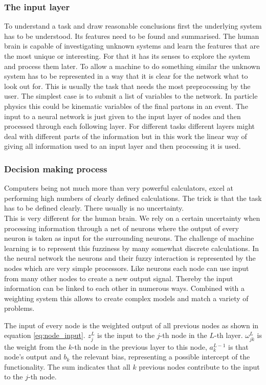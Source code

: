 \subsubsection{The input layer}

To understand a task and draw reasonable conclusions first the underlying system has to be understood. Its features need to be found and summarised. The human brain is capable of investigating unknown systems and learn the features that are the most unique or interesting. For that it has its senses to explore the system and process them later. To allow a machine to do something similar the unknown system has to be represented in a way that it is clear for the network what to look out for. This is usually the task that needs the most preprocessing by the user. The simplest case is to submit a list of variables to the network. In particle physics this could be kinematic variables of the final partons in an event.
The input to a neural network is just given to the input layer of nodes and then processed through each following layer. For different tasks different layers might deal with different parts of the information but in this work the linear way of giving all information used to an input layer and then processing it is used.

\subsubsection{Decision making process}

Computers being not much more than very powerful calculators, excel at performing high numbers of clearly defined calculations. The trick is that the task has to be defined clearly. There usually is no uncertainty.\\
This is very different for the human brain. We rely on a certain uncertainty when processing information through a net of neurons where the output of every neuron is taken as input for the surrounding neurons. The challenge of machine learning is to represent this fuzziness by many somewhat discrete calculations. In the neural network the neurons and their fuzzy interaction is represented by the nodes which are very simple processors. Like neurons each node can use input from many other nodes to create a new output signal. Thereby the input information can be linked to each other in numerous ways. Combined with a weighting system this allows to create complex models and match a variety of problems.

The input of every node is the weighted output of all previous nodes as shown in equation \eqref{eq:node_input}. $z_j^L$ is the input to the $j$-th node in the $L$-th layer. $\omega_{jk}^L$ is the weight from the $k$-th node in the previous layer to this node, $a_k^{L-1}$ is that node's output and $b_k$ the relevant bias, representing a possible intercept of the functionality. The sum indicates that all $k$ previous nodes contribute to the input to the $j$-th node.

